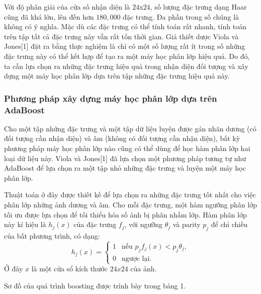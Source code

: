 \documentclass[14pt, oneside, a4paper, openany]{scrartcl}
\begin{document}
Với độ phân giải của cửa số nhận diện là $24$x$24$, số lượng đặc trưng dạng Haar cũng đã khá lớn, lên đến hơn $180,000$ đặc trưng. Đa phần trong số chúng là không có ý nghĩa. Mặc dù các đặc trưng có thể tính toán rất nhanh, tính toán trên tập tất cả đặc trưng này vẫn rất tốn thời gian. Giả thiết dược Viola và Jones[1] đặt ra bằng thực nghiệm là chỉ có một số lượng rất ít trong số những đặc trưng này có thể kết hợp để tạo ra một máy học phân lớp hiệu quả. Do đó, ta cần lựa chọn ra những đặc trưng hiệu quả trong nhận diện đối tượng và xây dựng một máy học phân lớp dựa trên tập những đặc trưng hiệu quả này.

\subsubsection{Phương pháp xây dựng máy học phân lớp dựa trên AdaBoost}
Cho một tập những đặc trưng và một tập dữ liệu luyện được gán nhãn dương (có đối tượng cần nhận diện) và âm (không có đối tượng cần nhận diện), bất kỳ phương pháp máy học phân lớp nào cũng có thể dùng để học hàm phân lớp hai loại dữ liệu này. Viola và Jones[1] đã lựa chọn một phương pháp tương tự như AdaBoost để lựa chọn ra một tập nhỏ những đặc trưng và luyện một máy học phân lớp.

Thuật toán ở đây được thiết kế để lựa chọn ra những đặc trưng tốt nhất cho việc phân lớp những ảnh dương và âm.
Cho mỗi đặc trưng, một hàm ngưỡng phân lớp tối ưu được lựa chọn để tối thiểu hóa số ảnh bị phân nhầm lớp. Hàm phân lớp này kí hiệu là $h_j(x)$ của đặc trưng $f_j$, với ngưỡng $\theta_j$ và parity $p_j$ để chỉ chiều của bất phương trình, có dạng:
$$
h_j(x)=
\begin{cases}
	1& \text{nếu $p_j f_j(x) < p_j\theta_j$},\\
	0& \text{ngược lại}.
\end{cases}
$$
Ở đây $x$ là một cửa sổ kích thước $24x24$ của ảnh.

Sơ đồ của quá trình boosting được trình bày trong bảng 1.
\end{document}

